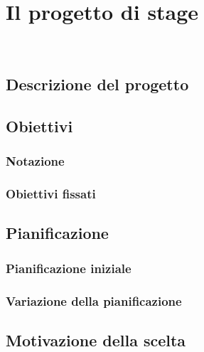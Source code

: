 \chapter{Il progetto di stage}
\label{cap:descrizione-stage}

\\

\section{Descrizione del progetto}
\label{sec:descrizione-progetto}

\section{Obiettivi}
\label{sec:obiettivi}

\subsection{Notazione}
\label{subsec:notazione}

\subsection{Obiettivi fissati}
\label{subsec:obiettivi-fissati}

\section{Pianificazione}
\label{sec:pianificazione}

\subsection{Pianificazione iniziale}
\label{subsec:pianificazione-iniziale}

\subsection{Variazione della pianificazione}
\label{subsec:variazione-pianificazione}

\section{Motivazione della scelta}
\label{sec:motivazione-scelta}